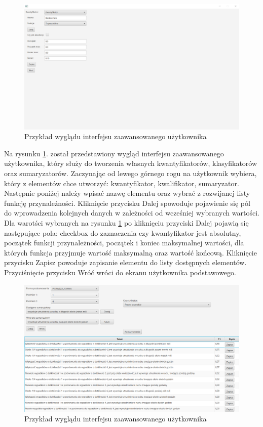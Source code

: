 \documentclass{classrep}
\begin{document}
\begin{figure}[h!]
\centering
\includegraphics[width=15cm]{gui_2.png}
\vspace{-0.3cm}
\caption{Przykład wyglądu interfejsu zaawansowanego użytkownika}
\label{gui2}
\end{figure}

Na rysunku \ref{gui2}. został przedstawiony wygląd interfejsu zaawansowanego użytkownika, który służy do tworzenia własnych kwantyfikatorów, klasyfikatorów oraz sumaryzatorów. Zaczynając od lewego górnego rogu na użytkownik wybiera, który z elementów chce utworzyć: kwantyfikator, kwalifikator, sumaryzator. Następnie poniżej należy wpisać nazwę elementu oraz wybrać z rozwijanej listy funkcję przynależności. Kliknięcie przycisku Dalej spowoduje pojawienie się pól do wprowadzenia kolejnych danych w zależności od wcześniej wybranych wartości. Dla warotści wybranych na rysunku \ref{gui2} po kliknięciu przyciski Dalej pojawią się następujące pola: checkbox do zaznaczenia czy kwantyfikator jest absolutny, początek funkcji przynależności, początek i koniec maksymalnej wartości, dla których funkcja przyjmuje wartość maksymalną oraz wartość końcową. Kliknięcie przycisku Zapisz powoduje zapisanie elementu do listy dostępnych elementów. Przyciśnięcie przycisku Wróć wróci do ekranu użytkownika podstawowego. \\

\begin{figure}[h!]
\centering
\includegraphics[width=15cm]{gui_3.png}
\vspace{-0.3cm}
\caption{Przykład wyglądu interfejsu zaawansowanego użytkownika}
\label{gui3}
\end{figure}
\end{document}
